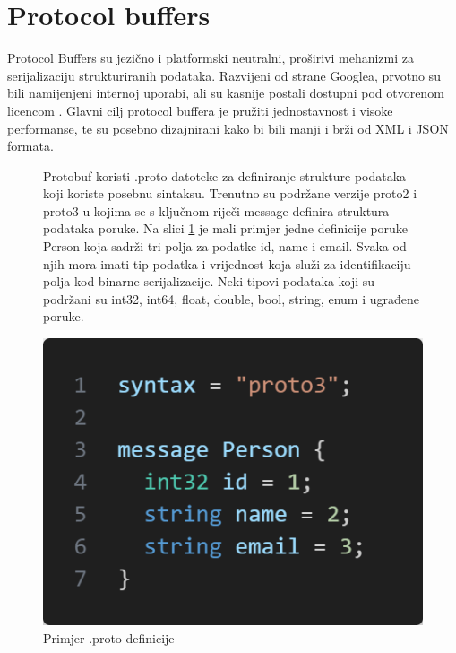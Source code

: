 \documentclass[zavrsnirad]{fer}
\begin{document}
\newpage
\section[Protobuf]{Protocol buffers}
\label{sec:protobuf}

Protocol Buffers su jezično i platformski neutralni, proširivi mehanizmi za serijalizaciju strukturiranih podataka. Razvijeni od strane Googlea, prvotno su bili namijenjeni internoj uporabi, ali su kasnije postali dostupni pod otvorenom licencom \cite{protobuf}. Glavni cilj protocol buffera je pružiti jednostavnost i visoke performanse, te su posebno dizajnirani kako bi bili manji i brži od XML i JSON formata.

\begin{figure}[H]
	\centering
	\begin{minipage}{0.75\linewidth}
		Protobuf koristi .proto datoteke za definiranje strukture podataka koji koriste posebnu sintaksu. Trenutno su podržane verzije proto2 i proto3 u kojima se s ključnom riječi message definira struktura podataka poruke. Na slici \ref{slk:proto} je mali primjer jedne definicije poruke Person koja sadrži tri polja za podatke id, name i email. Svaka od njih mora imati tip podatka i vrijednost koja služi za identifikaciju polja kod binarne serijalizacije. Neki tipovi podataka koji su podržani su int32, int64, float, double, bool, string, enum i ugrađene poruke.
		
	\end{minipage}
	\hfill
	\begin{minipage}{0.20\linewidth}
		\centering
		\includegraphics[width=\linewidth]{Figures/proto.png}
		\caption{Primjer .proto definicije}
		\label{slk:proto}
	\end{minipage}
\end{figure}
\end{document}
